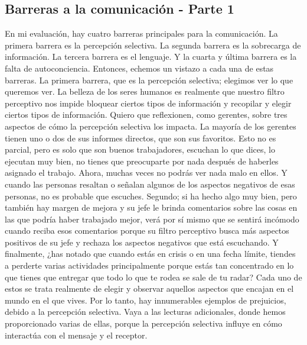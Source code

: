 \documentclass[10pt]{book}
\begin{document}
\subsection{Barreras a la comunicación - Parte 1}
En mi evaluación, hay cuatro barreras principales para la comunicación. La primera barrera es la percepción selectiva. La segunda barrera es la sobrecarga de información. La tercera barrera es el lenguaje. Y la cuarta y última barrera es la falta de autoconciencia. Entonces, echemos un vistazo a cada una de estas barreras. La primera barrera, que es la percepción selectiva; elegimos ver lo que queremos ver. La belleza de los seres humanos es realmente que nuestro filtro perceptivo nos impide bloquear ciertos tipos de información y recopilar y elegir ciertos tipos de información. Quiero que reflexionen, como gerentes, sobre tres aspectos de cómo la percepción selectiva los impacta. La mayoría de los gerentes tienen uno o dos de sus informes directos, que son sus favoritos. Esto no es parcial, pero es solo que son buenos trabajadores, escuchan lo que dices, lo ejecutan muy bien, no tienes que preocuparte por nada después de haberles asignado el trabajo. Ahora, muchas veces no podrás ver nada malo en ellos. Y cuando las personas resaltan o señalan algunos de los aspectos negativos de esas personas, no es probable que escuches. Segundo; si ha hecho algo muy bien, pero también hay margen de mejora y su jefe le brinda comentarios sobre las cosas en las que podría haber trabajado mejor, verá por sí mismo que se sentirá incómodo cuando reciba esos comentarios porque su filtro perceptivo busca más aspectos positivos de su jefe y rechaza los aspectos negativos que está escuchando. Y finalmente, ¿has notado que cuando estás en crisis o en una fecha límite, tiendes a perderte varias actividades principalmente porque estás tan concentrado en lo que tienes que entregar que todo lo que te rodea se sale de tu radar? Cada uno de estos se trata realmente de elegir y observar aquellos aspectos que encajan en el mundo en el que vives. Por lo tanto, hay innumerables ejemplos de prejuicios, debido a la percepción selectiva. Vaya a las lecturas adicionales, donde hemos proporcionado varias de ellas, porque la percepción selectiva influye en cómo interactúa con el mensaje y el receptor.
\end{document}

